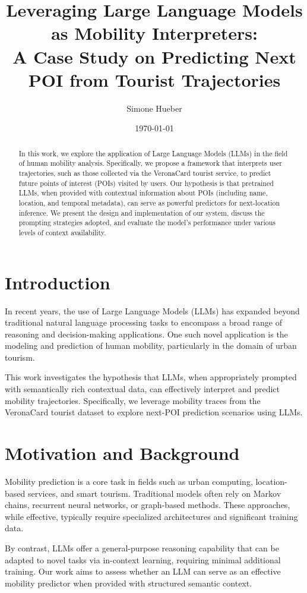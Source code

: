 \documentclass[a4paper,12pt]{article}
\title{Leveraging Large Language Models as Mobility Interpreters:\\
A Case Study on Predicting Next POI from Tourist Trajectories}
\author{Simone Hueber}
\date{\today}
\begin{document}
\maketitle

\begin{abstract}
In this work, we explore the application of Large Language Models (LLMs) in the field of human mobility analysis. Specifically, we propose a framework that interprets user trajectories, such as those collected via the VeronaCard tourist service, to predict future points of interest (POIs) visited by users. Our hypothesis is that pretrained LLMs, when provided with contextual information about POIs (including name, location, and temporal metadata), can serve as powerful predictors for next-location inference. We present the design and implementation of our system, discuss the prompting strategies adopted, and evaluate the model's performance under various levels of context availability.
\end{abstract}

\section{Introduction}

In recent years, the use of Large Language Models (LLMs) has expanded beyond traditional natural language processing tasks to encompass a broad range of reasoning and decision-making applications. One such novel application is the modeling and prediction of human mobility, particularly in the domain of urban tourism.

This work investigates the hypothesis that LLMs, when appropriately prompted with semantically rich contextual data, can effectively interpret and predict mobility trajectories. Specifically, we leverage mobility traces from the VeronaCard tourist dataset to explore next-POI prediction scenarios using LLMs.

\section{Motivation and Background}

Mobility prediction is a core task in fields such as urban computing, location-based services, and smart tourism. Traditional models often rely on Markov chains, recurrent neural networks, or graph-based methods. These approaches, while effective, typically require specialized architectures and significant training data.

By contrast, LLMs offer a general-purpose reasoning capability that can be adapted to novel tasks via in-context learning, requiring minimal additional training. Our work aims to assess whether an LLM can serve as an effective mobility predictor when provided with structured semantic context.
\end{document}
